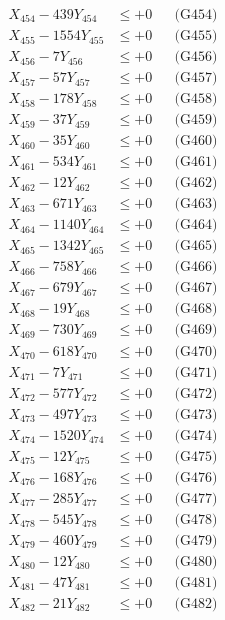 \documentclass[a4paper,10pt]{article}
\begin{document}
{\begin{align}
X_{454} - 439Y_{454} &\leq +0 && \text{(G454)} \\
X_{455} - 1554Y_{455} &\leq +0 && \text{(G455)} \\
X_{456} - 7Y_{456} &\leq +0 && \text{(G456)} \\
X_{457} - 57Y_{457} &\leq +0 && \text{(G457)} \\
X_{458} - 178Y_{458} &\leq +0 && \text{(G458)} \\
X_{459} - 37Y_{459} &\leq +0 && \text{(G459)} \\
X_{460} - 35Y_{460} &\leq +0 && \text{(G460)} \\
\allowbreak
X_{461} - 534Y_{461} &\leq +0 && \text{(G461)} \\
X_{462} - 12Y_{462} &\leq +0 && \text{(G462)} \\
X_{463} - 671Y_{463} &\leq +0 && \text{(G463)} \\
X_{464} - 1140Y_{464} &\leq +0 && \text{(G464)} \\
X_{465} - 1342Y_{465} &\leq +0 && \text{(G465)} \\
X_{466} - 758Y_{466} &\leq +0 && \text{(G466)} \\
X_{467} - 679Y_{467} &\leq +0 && \text{(G467)} \\
X_{468} - 19Y_{468} &\leq +0 && \text{(G468)} \\
X_{469} - 730Y_{469} &\leq +0 && \text{(G469)} \\
X_{470} - 618Y_{470} &\leq +0 && \text{(G470)} \\
\allowbreak
X_{471} - 7Y_{471} &\leq +0 && \text{(G471)} \\
X_{472} - 577Y_{472} &\leq +0 && \text{(G472)} \\
X_{473} - 497Y_{473} &\leq +0 && \text{(G473)} \\
X_{474} - 1520Y_{474} &\leq +0 && \text{(G474)} \\
X_{475} - 12Y_{475} &\leq +0 && \text{(G475)} \\
X_{476} - 168Y_{476} &\leq +0 && \text{(G476)} \\
X_{477} - 285Y_{477} &\leq +0 && \text{(G477)} \\
X_{478} - 545Y_{478} &\leq +0 && \text{(G478)} \\
X_{479} - 460Y_{479} &\leq +0 && \text{(G479)} \\
X_{480} - 12Y_{480} &\leq +0 && \text{(G480)} \\
\allowbreak
X_{481} - 47Y_{481} &\leq +0 && \text{(G481)} \\
X_{482} - 21Y_{482} &\leq +0 && \text{(G482)} \\

\end{align}}
\end{document}
